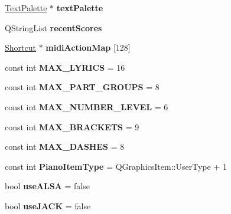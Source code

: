 \begin{DoxyCompactItemize}
\item 
\mbox{\label{namespace_ms_a6b39fe243d359623fd8bca0bee88023c}} 
\hyperlink{class_ms_1_1_text_palette}{Text\+Palette} $\ast$ {\bfseries text\+Palette}
\item 
\mbox{\label{namespace_ms_a572222142a8ff81a56ed2954c967df12}} 
Q\+String\+List {\bfseries recent\+Scores}
\item 
\mbox{\label{namespace_ms_a68194375631e784e87a806d423c27bf8}} 
\hyperlink{class_ms_1_1_shortcut}{Shortcut} $\ast$ {\bfseries midi\+Action\+Map} \mbox{[}128\mbox{]}
\item 
\mbox{\label{namespace_ms_aa711fcb0c0e35f883415bd7009e5eab9}} 
const int {\bfseries M\+A\+X\+\_\+\+L\+Y\+R\+I\+CS} = 16
\item 
\mbox{\label{namespace_ms_ae6c3d8d9186bd4251ad8fc0a58202969}} 
const int {\bfseries M\+A\+X\+\_\+\+P\+A\+R\+T\+\_\+\+G\+R\+O\+U\+PS} = 8
\item 
\mbox{\label{namespace_ms_adc5726d8af61bb7b474de67400b9f98c}} 
const int {\bfseries M\+A\+X\+\_\+\+N\+U\+M\+B\+E\+R\+\_\+\+L\+E\+V\+EL} = 6
\item 
\mbox{\label{namespace_ms_a8fca146bbcaa63c8c2757153a35dfa54}} 
const int {\bfseries M\+A\+X\+\_\+\+B\+R\+A\+C\+K\+E\+TS} = 9
\item 
\mbox{\label{namespace_ms_a26762915bd96a8b493f7c251807c9ece}} 
const int {\bfseries M\+A\+X\+\_\+\+D\+A\+S\+H\+ES} = 8
\item 
\mbox{\label{namespace_ms_a3c551097dc524334efcd8436f611b6b1}} 
const int {\bfseries Piano\+Item\+Type} = Q\+Graphics\+Item\+::\+User\+Type + 1
\item 
\mbox{\label{namespace_ms_a7f859cf8fe1446be130629bc4dc2519e}} 
bool {\bfseries use\+A\+L\+SA} = false
\item 
\mbox{\label{namespace_ms_a1a721f79c672402960d2490c4d8f6361}} 
bool {\bfseries use\+J\+A\+CK} = false
\item 

\end{DoxyCompactItemize}
